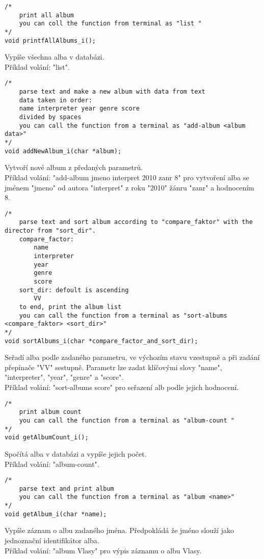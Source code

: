 \begin{lstlisting}[style=CStyle]
/*
    print all album
    you can coll the function from terminal as "list "
*/
void printfAllAlbums_i();
\end{lstlisting}
Vypíše všechna alba v databázi.\\ 
Příklad volání: "list".

\begin{lstlisting}[style=CStyle]
/*
    parse text and make a new album with data from text
    data taken in order:
    name interpreter year genre score
    divided by spaces
    you can call the function from a terminal as "add-album <album data>"
*/
void addNewAlbum_i(char *album); 
\end{lstlisting}
Vytvoří nové album z předaných parametrů.\\ 
Příklad volání: "add-album jmeno interpret 2010 zanr 8" pro vytvoření alba se jménem "jmeno" od autora "interpret" z roku "2010" žánru "zanr" a hodnocením 8.
\newpage
\begin{lstlisting}[style=CStyle]
/*
    parse text and sort album according to "compare_faktor" with the director from "sort_dir".
    compare_factor:
        name
        interpreter
        year
        genre
        score
    sort_dir: defoult is ascending
        VV
    to end, print the album list
    you can call the function from a terminal as "sort-albums <compare_faktor> <sort_dir>"
*/
void sortAlbums_i(char *compare_factor_and_sort_dir);
\end{lstlisting}
Seřadí alba podle zadaného parametru, ve výchozím stavu vzestupně a při zadání přepínače "VV" sestupně.
Parametr lze zadat klíčovými slovy "name", "interpreter", "year", "genre" a "score".\\ 
Příklad volání: "sort-albums score" pro seřazení alb podle jejich hodnocení.

\begin{lstlisting}[style=CStyle]
/*
    print album count
    you can call the function from a terminal as "album-count "
*/
void getAlbumCount_i();
\end{lstlisting}
Spočítá alba v databázi a vypíše jejich počet.\\ 
Příklad volání: "album-count".

\begin{lstlisting}[style=CStyle]
/*
    parse text and print album
    you can call the function from a terminal as "album <name>"
*/
void getAlbum_i(char *name);
\end{lstlisting}
Vypíše záznam o albu zadaného jména.
Předpokládá že jméno slouží jako jednoznační identifikátor alba.\\ 
Příklad volání: "album Vlasy" pro výpis záznamu o albu Vlasy.

